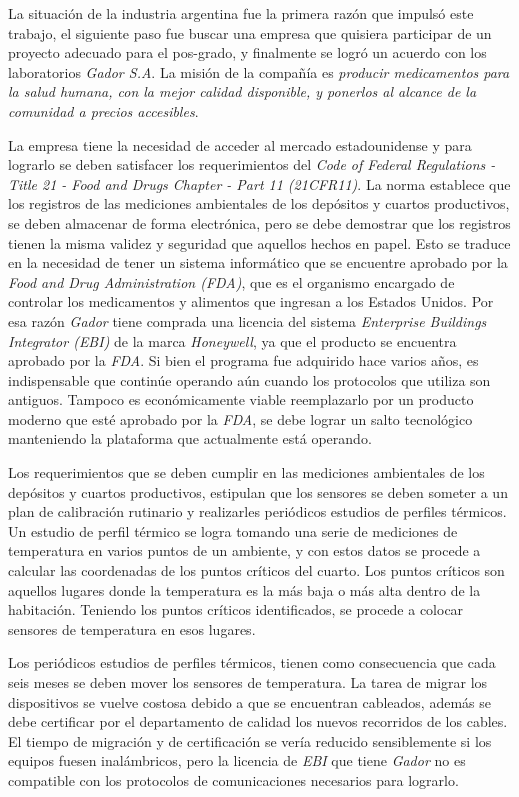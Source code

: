 La situación de la industria argentina fue la primera razón que impulsó este trabajo, el siguiente paso fue buscar una empresa que quisiera participar de un proyecto adecuado para el pos-grado, y finalmente se logró un acuerdo con los laboratorios \emph{Gador S.A}. La misión de la compañía es \emph{producir medicamentos para la salud humana, con la mejor calidad disponible, y ponerlos al alcance de la comunidad a precios accesibles}.

La empresa tiene la necesidad de acceder al mercado estadounidense y para lograrlo se deben satisfacer los requerimientos del \emph{Code of Federal Regulations - Title 21 - Food and Drugs Chapter - Part 11 (21CFR11)}. La norma establece que los registros de las mediciones ambientales de los depósitos y cuartos productivos, se deben almacenar de forma electrónica, pero se debe demostrar que los registros tienen la misma validez y seguridad que aquellos hechos en papel. Esto se traduce en la necesidad de tener un sistema informático que se encuentre aprobado por la \emph{Food and Drug Administration (FDA)}, que es el organismo encargado de controlar los medicamentos y alimentos que ingresan a los Estados Unidos.
Por esa razón \emph{Gador} tiene comprada una licencia del sistema \emph{Enterprise Buildings Integrator (EBI)} de la marca \emph{Honeywell}, ya que el producto se encuentra aprobado por la \emph{FDA}. 
Si bien el programa fue adquirido hace varios años, es indispensable que continúe operando aún cuando los protocolos que utiliza son antiguos. Tampoco es económicamente viable reemplazarlo por un producto moderno que esté aprobado por la \emph{FDA}, se debe lograr un salto tecnológico manteniendo la plataforma que actualmente está operando.

Los requerimientos que se deben cumplir en las mediciones ambientales de los depósitos y cuartos productivos, estipulan que los sensores se deben someter a un plan de calibración rutinario y realizarles periódicos estudios de perfiles térmicos.
Un estudio de perfil térmico se logra tomando una serie de mediciones de temperatura en varios puntos de un ambiente, y con estos datos se procede a calcular las coordenadas de los puntos críticos del cuarto.
Los puntos críticos son aquellos lugares donde la temperatura es la más baja o más alta dentro de la habitación.
Teniendo los puntos críticos identificados, se procede a colocar sensores de temperatura en esos lugares.

Los periódicos estudios de perfiles térmicos, tienen como consecuencia que cada seis meses se deben mover los sensores de temperatura.
La tarea de migrar los dispositivos se vuelve costosa debido a que se encuentran cableados, además se debe certificar por el departamento de calidad los nuevos recorridos de los cables. El tiempo de migración y de certificación se vería reducido sensiblemente si los equipos fuesen inalámbricos, pero la licencia de \emph{EBI} que tiene \emph{Gador} no es compatible con los protocolos de comunicaciones necesarios para lograrlo.

